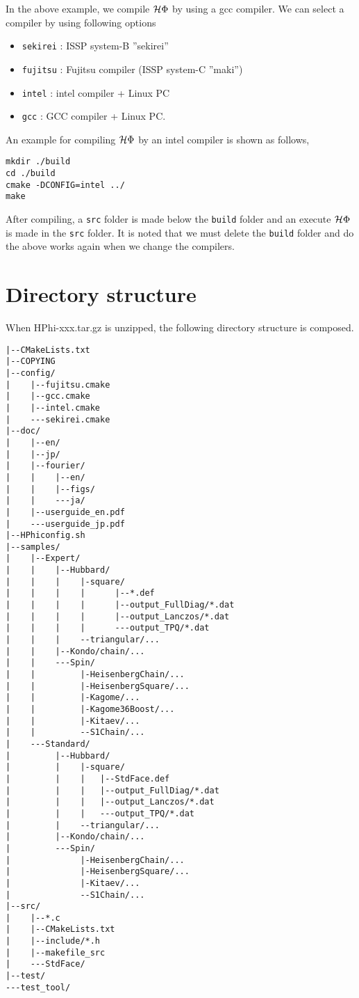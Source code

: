 In the above example, we compile $\mathcal{H} \Phi$ by using a gcc compiler. We can select a compiler by using following options
\begin{itemize}
\item \verb|sekirei| : ISSP system-B ''sekirei''
\item \verb|fujitsu| : Fujitsu compiler (ISSP system-C ''maki'')
\item \verb|intel| : intel compiler + Linux PC
\item \verb|gcc| : GCC compiler + Linux PC.
\end{itemize}
An example for compiling $\mathcal{H} \Phi$ by an intel compiler is shown as follows, 
\begin{verbatim}
mkdir ./build
cd ./build
cmake -DCONFIG=intel ../
make
\end{verbatim}
After compiling,  a \verb|src| folder is made below the \verb|build| folder and an execute $\mathcal{H} \Phi$ is made in the  \verb|src| folder. It is noted that  we must delete the  \verb|build| folder and do the above works again when we change the compilers.

\label{Sec:HowToInstall}

\section{Directory structure}
When HPhi-xxx.tar.gz is unzipped, the following directory structure is composed.
 
\begin{verbatim}
|--CMakeLists.txt
|--COPYING
|--config/
|    |--fujitsu.cmake
|    |--gcc.cmake
|    |--intel.cmake
|    ---sekirei.cmake
|--doc/
|    |--en/
|    |--jp/
|    |--fourier/
|    |    |--en/
|    |    |--figs/
|    |    ---ja/
|    |--userguide_en.pdf
|    ---userguide_jp.pdf
|--HPhiconfig.sh
|--samples/
|    |--Expert/
|    |    |--Hubbard/
|    |    |    |-square/
|    |    |    |      |--*.def
|    |    |    |      |--output_FullDiag/*.dat
|    |    |    |      |--output_Lanczos/*.dat
|    |    |    |      ---output_TPQ/*.dat
|    |    |    --triangular/...
|    |    |--Kondo/chain/...
|    |    ---Spin/
|    |         |-HeisenbergChain/...
|    |         |-HeisenbergSquare/...
|    |         |-Kagome/...
|    |         |-Kagome36Boost/...
|    |         |-Kitaev/...
|    |         --S1Chain/...
|    ---Standard/
|         |--Hubbard/
|         |    |-square/
|         |    |   |--StdFace.def
|         |    |   |--output_FullDiag/*.dat
|         |    |   |--output_Lanczos/*.dat
|         |    |   ---output_TPQ/*.dat
|         |    --triangular/...
|         |--Kondo/chain/...
|         ---Spin/
|              |-HeisenbergChain/...
|              |-HeisenbergSquare/...
|              |-Kitaev/...
|              --S1Chain/...
|--src/
|    |--*.c
|    |--CMakeLists.txt
|    |--include/*.h
|    |--makefile_src
|    ---StdFace/
|--test/
---test_tool/
\end{verbatim}

